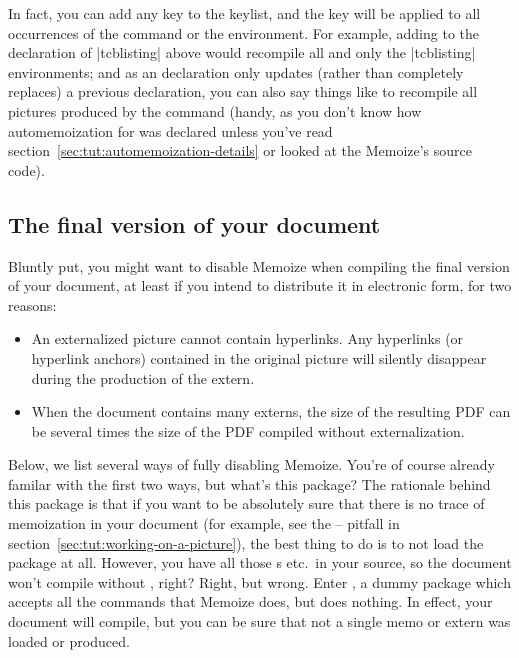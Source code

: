 \documentclass[a4paper,11pt]{article}
\begin{document}
In fact, you can add any  key to the  keylist,
and the key will be applied to all occurrences of the command or the
environment.  For example, adding  to the declaration of
|tcblisting| above would recompile all and only the |tcblisting| environments;
and as an  declaration only updates (rather than completely
replaces) a previous declaration, you can also say things like
 to recompile all
\TikZ pictures produced by the  command (handy, as you don't know how
automemoization for  was declared unless you've read
section~\ref{sec:tut:automemoization-details} or looked at the Memoize's source
code).


\subsection{The final version of your document}
\label{sec:tut:final}

Bluntly put, you might want to disable Memoize when compiling the final version
of your document, at least if you intend to distribute it in electronic form,
for two reasons:
\begin{itemize}
\item An externalized picture cannot contain hyperlinks.  Any hyperlinks (or
  hyperlink anchors) contained in the original picture will silently disappear
  during the production of the extern.
\item When the document contains many externs, the size of the resulting PDF
  can be several times the size of the PDF compiled without externalization.
\end{itemize}

Below, we list several ways of fully disabling Memoize.  You're of course
already familar with the first two ways, but what's this 
package?  The rationale behind this package is that if you want to be
absolutely sure that there is no trace of memoization in your document (for
example, see the  --  pitfall in
section~\ref{sec:tut:working-on-a-picture}), the best thing to do is to not
load the package at all.  However, you have all those s etc.\ in
your source, so the document won't compile without
, right?  Right, but wrong.  Enter
, a dummy package which accepts all the commands that
Memoize does, but does nothing.  In effect, your document will compile, but you
can be sure that not a single memo or extern was loaded or produced.
\end{document}
